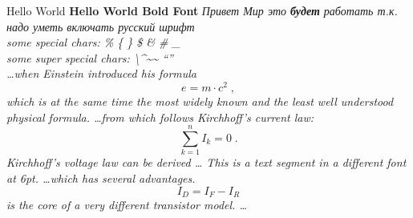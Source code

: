 \documentclass{article}
\begin{document}
\noindent Hello World\newline
\noindent\textbf{Hello World Bold Font}\newline
\it{Привет Мир} это \textbf{будет} работать т.к. надо уметь включать русский шрифт\\

some special chars: \% \{ \} \$ \& \# \_ \\
some super special chars: \textbackslash  \textasciicircum  \textasciitilde \~{}  ``'' \\
\ldots when Einstein introduced his formula
\begin{equation}
	e = m \cdot c^2 \; ,
\end{equation}
which is at the same time the most widely known
and the least well understood physical formula.
\ldots from which follows Kirchhoff's current law:
\begin{equation}
	\sum_{k=1}^{n} I_k = 0 \; .
\end{equation}
Kirchhoff's voltage law can be derived \ldots
{\jbmono \fontsize{6pt}{7pt}\selectfont This is a text segment in a different font at 6pt.}
\ldots which has several advantages.
\begin{equation}
	I_D = I_F - I_R
\end{equation}
is the core of a very different transistor model. \ldots
\end{document}
